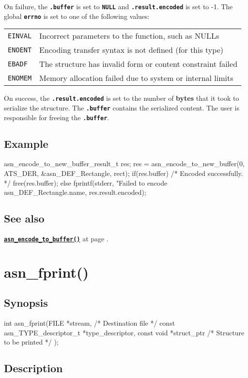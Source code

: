 \documentclass[english,oneside,12pt]{book}
\newcommand{\apisection}[2]{\clearpage\section{\label{#1}#2}}
\newcommand{\api}[2]{\hyperref[#1]{\code{#2}}}
\newcommand{\seealso}[2]{\api{#1}{#2} at page \pageref{#1}}
\newcommand{\code}[1]{\texttt{\textbf{\lstinline{#1}}}}
\begin{document}
On failure, the \code{.buffer} is set to \code{NULL}
and \code{.result.encoded} is set to -1. The global \code{errno} is set
to one of the following values:

\begin{tabular}[h!]{ll}
\texttt{EINVAL} & Incorrect parameters to the function, such as NULLs \\
\texttt{ENOENT} & Encoding transfer syntax is not defined (for this type) \\
\texttt{EBADF} & The structure has invalid form or content constraint failed \\
\texttt{ENOMEM} & Memory allocation failed due to system or internal limits
\end{tabular}

\noindent{}On success, the \code{.result.encoded} is set to the number of
\textbf{bytes} that it took to serialize the structure.
The \code{.buffer} contains the serialized content.
The user is responsible for freeing the \code{.buffer}.

\subsection*{Example}
\begin{example}
asn_encode_to_new_buffer_result_t res;
res = asn_encode_to_new_buffer(0, ATS_DER, &asn_DEF_Rectangle, rect);
if(res.buffer) {
    /* Encoded successfully. */
    free(res.buffer);
} else {
    fprintf(stderr, "Failed to encode %
        asn_DEF_Rectangle.name, res.result.encoded);
}
\end{example}

\subsection*{See also}
\seealso{sec:asn_encode_to_buffer}{asn_encode_to_buffer()}.

\apisection{sec:asn_fprint}{asn\_fprint()}

\subsection*{Synopsis}
\begin{signature}
int asn_fprint(FILE *stream,    /* Destination file */
    const asn_TYPE_descriptor_t *type_descriptor,
    const void *struct_ptr      /* Structure to be printed */
);
\end{signature}

\subsection*{Description}
\end{document}
